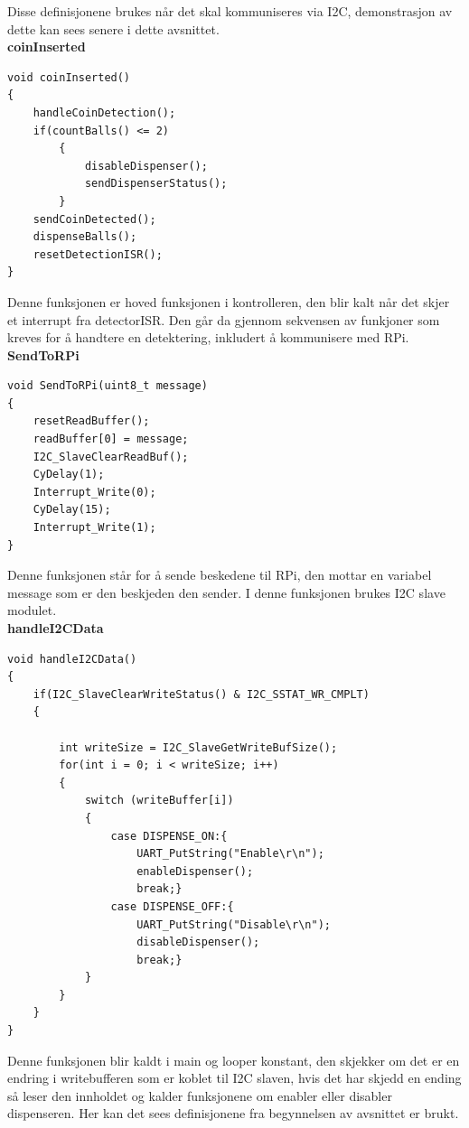\documentclass[Softwaredesign/Softwaredesign_main.tex]{subfiles}
\begin{document}
Disse definisjonene brukes når det skal kommuniseres via I2C, demonstrasjon av dette kan sees senere i dette avsnittet.\\

{\textbf{coinInserted}}\\
\begin{lstlisting}[caption={Hoved kontrol funksjonen til ballDispenser},style=customc,label={lst:coinInserted}]
void coinInserted()
{
    handleCoinDetection();
    if(countBalls() <= 2)
        {
            disableDispenser(); 
            sendDispenserStatus();
        }
    sendCoinDetected();
    dispenseBalls();
    resetDetectionISR();
}
\end{lstlisting}
Denne funksjonen er hoved funksjonen i kontrolleren, den blir kalt når det skjer et interrupt fra detectorISR. Den går da gjennom sekvensen av funkjoner som kreves for å handtere en detektering, inkludert å kommunisere med RPi.\\

{\textbf{SendToRPi}}\\
\begin{lstlisting}[caption={Komunikasjon fra Ball Dispenser til RPi},style=customc,label={lst:sendtorpi}]
void SendToRPi(uint8_t message)
{
    resetReadBuffer();
    readBuffer[0] = message;
    I2C_SlaveClearReadBuf();
    CyDelay(1);
    Interrupt_Write(0);
    CyDelay(15);
    Interrupt_Write(1);
}
\end{lstlisting}

Denne funksjonen står for å sende beskedene til RPi, den mottar en variabel message som er den beskjeden den sender. I denne funksjonen brukes I2C slave modulet.\\

{\textbf{handleI2CData}}\\
\begin{lstlisting}[caption={Komunikasjon fra RPi til Ball Dispenser},style=customc,label={lst:handleI2CData}]
void handleI2CData()
{
    if(I2C_SlaveClearWriteStatus() & I2C_SSTAT_WR_CMPLT)
    {
        
        int writeSize = I2C_SlaveGetWriteBufSize();
        for(int i = 0; i < writeSize; i++)
        {
            switch (writeBuffer[i])
            {
                case DISPENSE_ON:{
                    UART_PutString("Enable\r\n");
                    enableDispenser();
                    break;}
                case DISPENSE_OFF:{
                    UART_PutString("Disable\r\n");
                    disableDispenser();
                    break;} 
            }
        }
    }
}
\end{lstlisting}
Denne funksjonen blir kaldt i main og looper konstant, den skjekker om det er en endring i writebufferen som er koblet til I2C slaven, hvis det har skjedd en ending så leser den innholdet og kalder funksjonene om enabler eller disabler dispenseren. Her kan det sees definisjonene fra begynnelsen av avsnittet er brukt.
\end{document}
